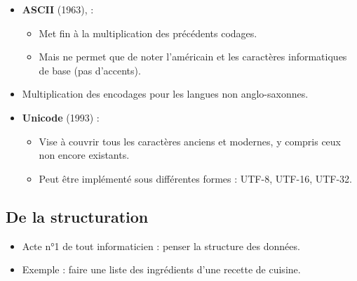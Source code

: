 \begin{slide}
  \begin{itemize}
    \item \textbf{ASCII} (1963), :
      \begin{itemize}
	\item Met fin à la multiplication des précédents codages.
	\item Mais ne permet que de noter l'américain et les caractères informatiques de base (pas d'accents).
      \end{itemize}
    \item Multiplication des encodages pour les langues non anglo-saxonnes.
    \item \textbf{Unicode} (1993) : 
      \begin{itemize}
	\item Vise à couvrir tous les caractères anciens et modernes, y compris ceux non encore existants.
	\item Peut être implémenté sous différentes formes  : UTF-8, UTF-16, UTF-32.
      \end{itemize}
  \end{itemize}
\end{slide}

\subsection{De la structuration}
\begin{slide}
  \begin{itemize}
    \item Acte n°1 de tout informaticien : penser la structure des données.
    \item Exemple : faire une liste des ingrédients d'une recette de cuisine.
  \end{itemize}
\end{slide}

